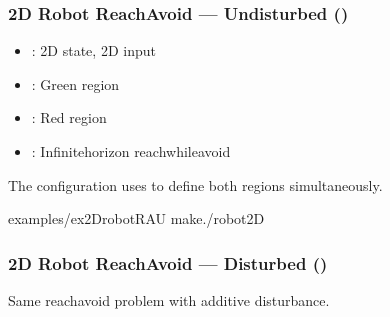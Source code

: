 \documentclass[a4paper,10pt,english]{sphinxmanual}
\let\sphinxpxdimen\pdfpxdimen\else\newdimen\sphinxpxdimen
\begin{document}
\subsubsection{2D Robot Reach\sphinxhyphen{}Avoid — Undisturbed ()}
\label{\detokenize{examples/reach-avoid:d-robot-reach-avoid-undisturbed-ex-2drobot-ra-u}}
\noindent{\hspace*{\fill}\sphinxincludegraphics[width=400\sphinxpxdimen]{{fig}.png}\hspace*{\fill}}

\sphinxAtStartPar
{}
\begin{itemize}
\item {} 
\sphinxAtStartPar
{}: 2D state, 2D input

\item {} 
\sphinxAtStartPar
{}: Green region

\item {} 
\sphinxAtStartPar
{}: Red region

\item {} 
\sphinxAtStartPar
{}: Infinite\sphinxhyphen{}horizon reach\sphinxhyphen{}while\sphinxhyphen{}avoid

\end{itemize}

\sphinxAtStartPar
The configuration uses  to define both regions simultaneously.

\sphinxAtStartPar
{}

\begin{sphinxVerbatim}[commandchars=\\\{\}]
examples/ex\PYGZus{}2Drobot\PYGZhy{}RA\PYGZhy{}U
make./robot2D
\end{sphinxVerbatim}


\subsubsection{2D Robot Reach\sphinxhyphen{}Avoid — Disturbed ()}
\label{\detokenize{examples/reach-avoid:d-robot-reach-avoid-disturbed-ex-2drobot-ra-d}}
\sphinxAtStartPar
Same reach\sphinxhyphen{}avoid problem with additive disturbance.
\end{document}
